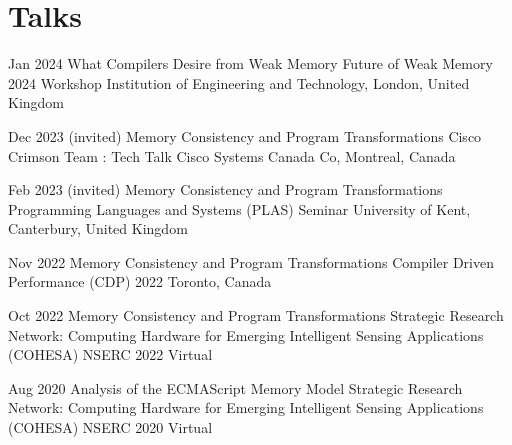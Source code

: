 \section{Talks}

    \cventry
        {Jan 2024}
        {What Compilers Desire from Weak Memory}
        {Future of Weak Memory 2024 Workshop}
        {Institution of Engineering and Technology, London, United Kingdom}
        {}
        {}


    \cventry
        {Dec 2023 (invited)}
        {Memory Consistency and Program Transformations}
        {Cisco Crimson Team : Tech Talk}
        {Cisco Systems Canada Co, Montreal, Canada}
        {}
        {}


    \cventry
        {Feb 2023 (invited)}
        {Memory Consistency and Program Transformations}
        {Programming Languages and Systems (PLAS) Seminar}
        {University of Kent, Canterbury, United Kingdom}
        {}
        {}

    \cventry
        {Nov 2022}
        {Memory Consistency and Program Transformations}
        {Compiler Driven Performance (CDP) 2022}
        {Toronto, Canada}
        {}
        {}

    \cventry
        {Oct 2022}
        {Memory Consistency and Program Transformations}
        {Strategic Research Network: Computing Hardware for Emerging Intelligent Sensing Applications (COHESA) NSERC 2022}
        {Virtual}
        {}
        {}

    \cventry
        {Aug 2020}
        {Analysis of the ECMAScript Memory Model}
        {Strategic Research Network: Computing Hardware for Emerging Intelligent Sensing Applications (COHESA) NSERC 2020}
        {Virtual}
        {}
        {}
